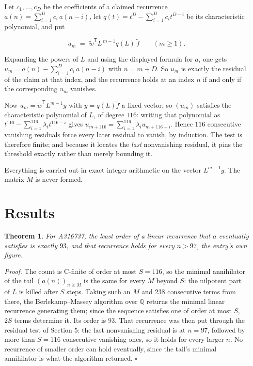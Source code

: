 \documentclass[11pt]{article}
\newtheorem{theorem}{Theorem}
\theoremstyle{definition}
\begin{document}
Let $c_1,\dots,c_D$ be the coefficients of a claimed recurrence $a(n) = \sum_{i=1}^{D} c_i\,a(n-i)$, let $q(t) = t^{D} - \sum_{i=1}^{D} c_i t^{D-i}$ be its characteristic polynomial, and put

\[u_m \;=\; \tilde w^{\mathsf T} L^{\,m-1} q(L)\,\tilde f \qquad (m \ge 1).\]

Expanding the powers of $L$ and using the displayed formula for $a$, one gets $u_m = a(n) - \sum_{i=1}^{D} c_i\,a(n-i)$ with $n = m + D$. So $u_m$ is exactly the residual of the claim at that index, and the recurrence holds at an index $n$ if and only if the corresponding $u_m$ vanishes.

Now $u_m = \tilde w^{\mathsf T} L^{m-1} y$ with $y = q(L)\tilde f$ a fixed vector, so $(u_m)$ satisfies the characteristic polynomial of $L$, of degree $116$: writing that polynomial as $t^{116} - \sum_{i=1}^{116} \lambda_i t^{116-i}$ gives $u_{m+116} = \sum_{i=1}^{116} \lambda_i u_{m+116-i}$. Hence $116$ consecutive vanishing residuals force every later residual to vanish, by induction. The test is therefore finite; and because it locates the {\itshape last} nonvanishing residual, it pins the threshold exactly rather than merely bounding it.

Everything is carried out in exact integer arithmetic on the vector $L^{m-1}y$. The matrix $M$ is never formed.

\section{Results}

\begin{theorem} For A316737, the least order of a linear recurrence that $a$ eventually satisfies is exactly $93$, and that recurrence holds for every $n > 97$, the entry's own figure.\end{theorem}

{\itshape Proof.} The count is C-finite of order at most $S = 116$, so the minimal annihilator of the tail $(a(n))_{n \ge M}$ is the same for every $M$ beyond $S$: the nilpotent part of $L$ is killed after $S$ steps. Taking such an $M$ and $238$ consecutive terms from there, the Berlekamp--Massey algorithm over $\mathbb{Q}$ returns the minimal linear recurrence generating them; since the sequence satisfies one of order at most $S$, $2S$ terms determine it. Its order is $93$. That recurrence was then put through the residual test of Section 5: the last nonvanishing residual is at $n = 97$, followed by more than $S = 116$ consecutive vanishing ones, so it holds for every larger $n$. No recurrence of smaller order can hold eventually, since the tail's minimal annihilator is what the algorithm returned. $\square$
\end{document}
